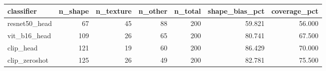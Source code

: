 \begin{tabular}{lrrrrrr}
\toprule
classifier & n_shape & n_texture & n_other & n_total & shape_bias_pct & coverage_pct \\
\midrule
resnet50_head & 67 & 45 & 88 & 200 & 59.821 & 56.000 \\
vit_b16_head & 109 & 26 & 65 & 200 & 80.741 & 67.500 \\
clip_head & 121 & 19 & 60 & 200 & 86.429 & 70.000 \\
clip_zeroshot & 125 & 26 & 49 & 200 & 82.781 & 75.500 \\
\bottomrule
\end{tabular}
